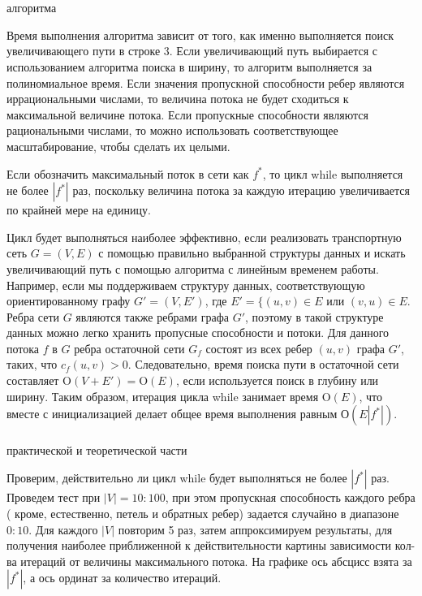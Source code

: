 \documentclass[12pt]{article}
\begin{document}
	~\\
	~\\
	{\large{ алгоритма}}
	~\\
	\par Время выполнения алгоритма зависит от того, как именно выполняется поиск увеличивающего пути в строке 3. Если увеличивающий путь выбирается с использованием алгоритма поиска в ширину, то алгоритм выполняется за полиномиальное время. Если значения пропускной способности ребер являются иррациональными числами, то величина потока не будет сходиться к максимальной величине потока. Если пропускные способности являются рациональными числами, то можно использовать соответствующее масштабирование, чтобы сделать их целыми.
	\par Если обозначить максимальный поток в сети как $f^*$, то цикл while выполняется не более $|f^*|$  раз, поскольку величина потока за каждую итерацию увеличивается по крайней мере на единицу.
	\par Цикл будет выполняться наиболее эффективно, если реализовать транспортную сеть $G = (V, E)$ с помощью правильно выбранной структуры данных и искать увеличивающий путь с помощью алгоритма с линейным временем работы. Например, если мы поддерживаем структуру данных, соответствующую ориентированному графу $G' = (V, E')$, где $E' = \{(u,v) \in E \mbox{ или } (v,u) \in E$. Ребра сети $G$ являются также ребрами графа $G'$, поэтому в такой структуре данных можно легко хранить пропусные способности и потоки. Для данного потока $f$ в $G$ ребра остаточной сети $G_f$ состоят из всех ребер $(u,v)$ графа $G'$, таких, что $c_f(u,v) > 0$. Следовательно, время поиска пути в остаточной сети составляет O$(V + E') = \mbox{O}(E)$, если используется поиск в глубину или ширину. Таким образом, итерация цикла while занимает время O$(E)$, что вместе с инициализацией делает общее время выполнения равным О$(E|f^*|)$.
	~\\
	~\\
	{\large{ практической и теоретической части}}
	~\\
	\par Проверим, действительно ли цикл while будет выполняться не более $|f^*|$ раз. Проведем тест при $|V| = 10 : 100$, при этом пропускная способность каждого ребра ( кроме, естественно, петель и обратных ребер) задается случайно в диапазоне $0: 10$. Для каждого $|V|$ повторим 5 раз, затем аппроксимируем результаты, для получения наиболее приближенной к действительности картины зависимости кол-ва итераций от величины максимального потока. На графике ось абсцисс взята за $|f^*|$, а ось ординат за количество итераций.
\end{document}

